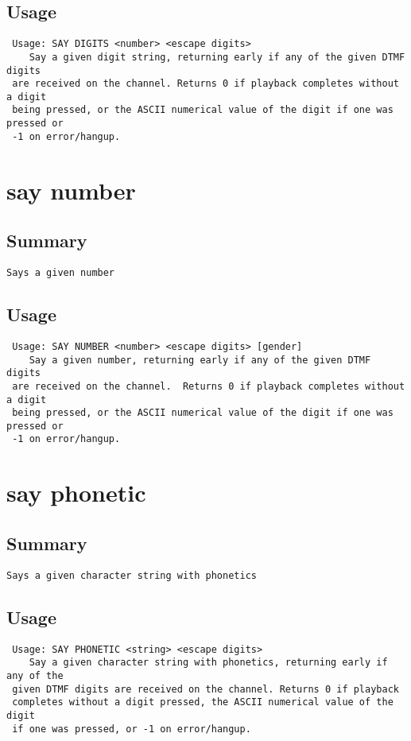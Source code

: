 \subsection{Usage}
\begin{verbatim}
 Usage: SAY DIGITS <number> <escape digits>
	Say a given digit string, returning early if any of the given DTMF digits
 are received on the channel. Returns 0 if playback completes without a digit
 being pressed, or the ASCII numerical value of the digit if one was pressed or
 -1 on error/hangup.

\end{verbatim}


\section{say number}
\subsection{Summary}
\begin{verbatim}
Says a given number
\end{verbatim}
\subsection{Usage}
\begin{verbatim}
 Usage: SAY NUMBER <number> <escape digits> [gender]
	Say a given number, returning early if any of the given DTMF digits
 are received on the channel.  Returns 0 if playback completes without a digit
 being pressed, or the ASCII numerical value of the digit if one was pressed or
 -1 on error/hangup.

\end{verbatim}


\section{say phonetic}
\subsection{Summary}
\begin{verbatim}
Says a given character string with phonetics
\end{verbatim}
\subsection{Usage}
\begin{verbatim}
 Usage: SAY PHONETIC <string> <escape digits>
	Say a given character string with phonetics, returning early if any of the
 given DTMF digits are received on the channel. Returns 0 if playback
 completes without a digit pressed, the ASCII numerical value of the digit
 if one was pressed, or -1 on error/hangup.

\end{verbatim}


